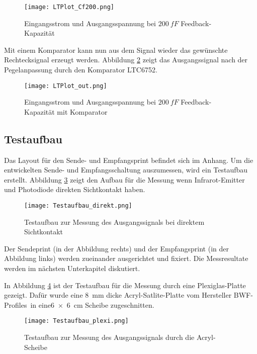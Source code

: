 \begin{figure}[H]
	\centering
	\texttt{[image: LTPlot\_Cf200.png]}
	\caption{Eingangsstrom und Ausgangsspannung bei $\SI{200}{fF}$ Feedback-Kapazität}\label{fig:Plot_Cf200}
\end{figure}

Mit einem Komparator kann nun aus dem Signal wieder das gewünschte Rechtecksignal erzeugt werden. Abbildung \ref{fig:Plot_out} zeigt das Ausgangssignal nach der Pegelanpassung durch den Komparator LTC6752.

\begin{figure}[H]
	\centering
	\texttt{[image: LTPlot\_out.png]}
	\caption{Eingangsstrom und Ausgangsspannung bei $\SI{200}{fF}$ Feedback-Kapazität mit Komparator}\label{fig:Plot_out}
\end{figure}



\newpage
\subsection{Testaufbau}
\label{subsec:Testaufbau}
Das Layout für den Sende- und Empfangsprint befindet sich im Anhang. Um die entwickelten Sende- und Empfangsschaltung auszumessen, wird ein Testaufbau erstellt. Abbildung \ref{fig:Test_direkt} zeigt den Aufbau für die Messung wenn Infrarot-Emitter und Photodiode direkten Sichtkontakt haben.
\begin{figure}[H]
	\centering
	\texttt{[image: Testaufbau\_direkt.png]}
	\caption{Testaufbau zur Messung des Ausgangssignals bei direktem Sichtkontakt}\label{fig:Test_direkt}
\end{figure}
Der Sendeprint (in der Abbildung rechts) und der Empfangsprint (in der Abbildung links) werden zueinander ausgerichtet und fixiert. Die Messresultate werden im nächsten Unterkapitel diskutiert.

In Abbildung \ref{fig:Test_plexi} ist der Testaufbau für die Messung durch eine Plexiglas-Platte gezeigt. Dafür wurde eine \SI{8}{mm} dicke Acryl-Satlite-Platte vom Hersteller \glqq BWF-Profiles\grqq\  in eine\linebreak \SI{6x6}{cm} Scheibe zugeschnitten.
\begin{figure}[H]
	\centering
	\texttt{[image: Testaufbau\_plexi.png]}
	\caption{Testaufbau zur Messung des Ausgangssignals durch die Acryl-Scheibe}\label{fig:Test_plexi}
\end{figure}


